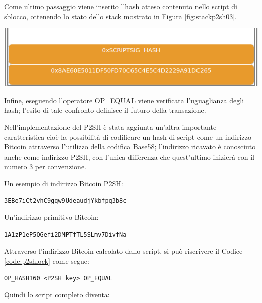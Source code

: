 Come ultimo passaggio viene inserito l’hash atteso contenuto nello script di sblocco, ottenendo lo stato dello stack mostrato in Figura \ref{fig:stackp2sh03}.

{\centering
\vspace{15pt}
\includegraphics[scale=0.35]{images/script/p2sh/3.png}
\vspace{10pt}
\par}

Infine, eseguendo l’operatore OP\_EQUAL viene verificata l’uguaglianza degli hash; l’esito di tale confronto definisce il futuro della transazione.

Nell'implementazione del P2SH è stata aggiunta un’altra importante caratteristica cioè la possibilità di codificare un hash di script come un indirizzo Bitcoin attraverso l’utilizzo della codifica Base58; l’indirizzo ricavato è conosciuto anche come indirizzo P2SH, con l’unica differenza che quest'ultimo inizierà con il numero 3 per convenzione.

Un esempio di indirizzo Bitcoin P2SH:

\begin{lstlisting}[language=bitcoinscript, caption={Indirizzo Bitcoin P2SH.}]
3EBe7iCt2vhC9gqw9UdeaudjYkbfpq3b8c
\end{lstlisting}

Un'indirizzo primitivo Bitcoin:

\begin{lstlisting}[language=bitcoinscript, caption={Indirizzo Bitcoin primitivo.}]
1A1zP1eP5QGefi2DMPTfTL5SLmv7DivfNa
\end{lstlisting}

Attraverso l’indirizzo Bitcoin calcolato dallo script, si può riscrivere il Codice \ref{code:p2shlock} come segue:
\begin{lstlisting}[language=bitcoinscript, label={code:p2shlockwithkey}, caption={Script P2SH di blocco con Indirizzo Bitcoin P2SH.}]
OP_HASH160 <P2SH key> OP_EQUAL
\end{lstlisting}

Quindi lo script completo diventa:

